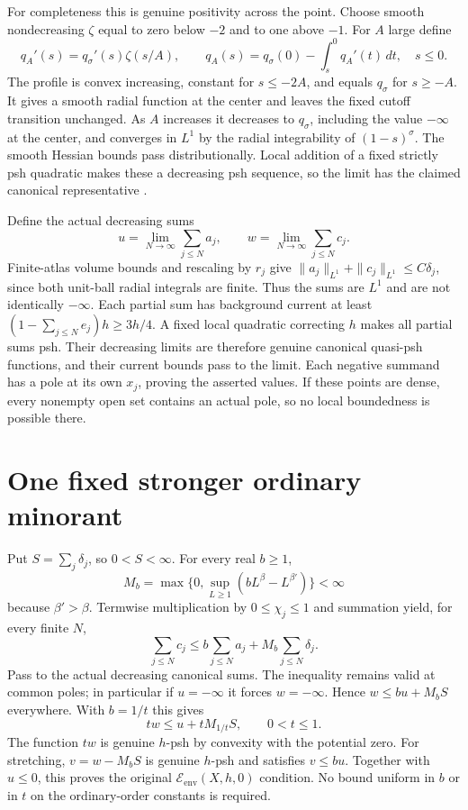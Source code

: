 \documentclass[11pt]{article}
\theoremstyle{remark}\newtheorem{remark}[theorem]{Remark}
\newcommand{\Eenv}{\mathcal E_{\mathrm{env}}}
\begin{document}
For completeness this is genuine positivity across the point. Choose
smooth nondecreasing $\zeta$ equal to zero below $-2$ and to one above
$-1$. For $A$ large define
\[
 q_A'(s)=q_\sigma'(s)\zeta(s/A),\qquad
 q_A(s)=q_\sigma(0)-\int_s^0q_A'(t)\,dt,\quad s\leq0.
\]
The profile is convex increasing, constant for $s\leq-2A$, and equals
$q_\sigma$ for $s\geq-A$. It gives a smooth radial function at the
center and leaves the fixed cutoff transition unchanged. As $A$ increases
it decreases to $q_\sigma$, including the value $-\infty$ at the center,
and converges in $L^1$ by the radial integrability of $(1-s)^\sigma$.
The smooth Hessian bounds pass distributionally. Local addition of a
fixed strictly psh quadratic makes these a decreasing psh sequence, so
the limit has the claimed canonical representative
\cite[Theorems I.5.4 and I.5.8]{Dem}.

Define the actual decreasing sums
\[
 u=\lim_{N\to\infty}\sum_{j\leq N}a_j,\qquad
 w=\lim_{N\to\infty}\sum_{j\leq N}c_j.
\]
Finite-atlas volume bounds and rescaling by $r_j$ give
$\|a_j\|_{L^1}+\|c_j\|_{L^1}\leq C\delta_j$, since both unit-ball
radial integrals are finite. Thus the sums are $L^1$ and are not
identically $-\infty$. Each partial sum has background current at least
$(1-\sum_{j\leq N}e_j)h\geq3h/4$. A fixed local quadratic correcting
$h$ makes all partial sums psh. Their decreasing limits are therefore
genuine canonical quasi-psh functions, and their current bounds pass to
the limit. Each negative summand has a pole at its own $x_j$, proving
the asserted values. If these points are dense, every nonempty open set
contains an actual pole, so no local boundedness is possible there.

\section{One fixed stronger ordinary minorant}
Put $S=\sum_j\delta_j$, so $0<S<\infty$. For every real $b\geq1$,
\[
 M_b=\max\{0,\sup_{L\geq1}(bL^\beta-L^{\beta'})\}<\infty
\]
because $\beta'>\beta$. Termwise multiplication by $0\leq\chi_j\leq1$
and summation yield, for every finite $N$,
\[
 \sum_{j\leq N}c_j\leq b\sum_{j\leq N}a_j
                                  +M_b\sum_{j\leq N}\delta_j.
\]
Pass to the actual decreasing canonical sums. The inequality remains
valid at common poles; in particular if $u=-\infty$ it forces
$w=-\infty$. Hence $w\leq bu+M_bS$ everywhere. With $b=1/t$ this
gives
\begin{equation}\label{eq:minorant}
 tw\leq u+tM_{1/t}S,\qquad 0<t\leq1.
\end{equation}
The function $tw$ is genuine $h$-psh by convexity with the potential zero.
For stretching, $v=w-M_bS$ is genuine $h$-psh and satisfies $v\leq bu$.
Together with $u\leq0$, this proves the original $\Eenv(X,h,0)$ condition.
No bound uniform in $b$ or in $t$ on the ordinary-order constants is
required.
\end{document}
